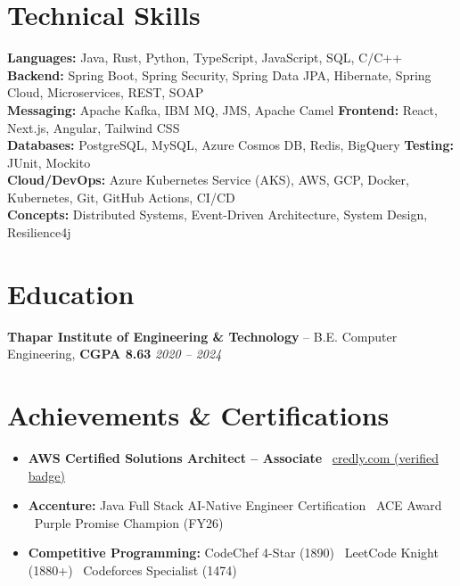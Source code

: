 \documentclass[10pt]{article}
\begin{document}
\section*{Technical Skills}
\textbf{Languages:} Java, Rust, Python, TypeScript, JavaScript, SQL, C/C++ \\[1pt]
\vspace{2pt}
\textbf{Backend:} Spring Boot, Spring Security, Spring Data JPA, Hibernate, Spring Cloud, Microservices, REST, SOAP \\[1pt]
\vspace{2pt}
\textbf{Messaging:} Apache Kafka, IBM MQ, JMS, Apache Camel \quad \textbf{Frontend:} React, Next.js, Angular, Tailwind CSS \\[1pt]
\vspace{2pt}
\textbf{Databases:} PostgreSQL, MySQL, Azure Cosmos DB, Redis, BigQuery \quad \textbf{Testing:} JUnit, Mockito \\[1pt]
\vspace{2pt}
\textbf{Cloud/DevOps:} Azure Kubernetes Service (AKS), AWS, GCP, Docker, Kubernetes, Git, GitHub Actions, CI/CD \\[1pt]
\vspace{2pt}
\textbf{Concepts:} Distributed Systems, Event-Driven Architecture, System Design, Resilience4j

\section*{Education}
\textbf{Thapar Institute of Engineering \& Technology} -- B.E. Computer Engineering, \textbf{CGPA 8.63} \hfill \textit{2020 -- 2024}

\section*{Achievements \& Certifications}
\begin{itemize}
    \item \textbf{AWS Certified Solutions Architect -- Associate} \textbar\ \href{https://www.credly.com/badges/f35f74d7-9305-4aaa-9107-bcb26bfacdaf/public_url}{credly.com (verified badge)}
    \item \textbf{Accenture:} Java Full Stack AI-Native Engineer Certification \textbar\ ACE Award \textbar\ Purple Promise Champion (FY26)
    \item \textbf{Competitive Programming:} CodeChef 4-Star (1890) \textbar\ LeetCode Knight (1880+) \textbar\ Codeforces Specialist (1474)
\end{itemize}
\end{document}
